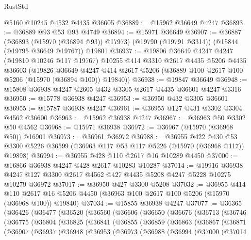 \begin{lexlean}{RustStd}
\begin{coremodule}
    @5160
    @10245
    @4532
    @4435
    @36605
@36889 := @15962 @36649 @4247
@36893 := @36889 @93 @53 @93 @4749
@36894 := @15971 @36649
@36907 := @36887
    (@36893 (@15970 (@36894 @93)) @17973)
    (@19790 (@19791 @3314))
    (@15844 (@19795 @36649 @19767))
    @19801
@36937 := @19806
    @36649
    @4247
    @4247
    (@19810 @10246 @117 @19767)
    @10255
    @414
    @3310
    @2617
    @4435
    @5206
    @4435
    @36603
    (@19826
      @36649
      @4247
      @414
      @2617
      @5206
      (@36889 @100 @2617 @100 @5206 (@15970 (@36894 @100)) @19840))
@36938 := @19847 @36649
@36948 := @15808 @36938 @4247 @2605 @432 @3305 @2617 @4435 @36601 @4247 @3316
@36950 := @15778 @36938 @4247
@36953 := @36950 @432 @3305 @36601
@36955 := @15787 @36938 @4247
@36961 := @36955 @127 @431 @3302 @3304 @4562 @36600
@36963 := @15962 @36938 @4247
@36967 := @36963 @50 @3302 @50 @4562
@36968 := @15971 @36938
@36972 := @36967 (@15970 (@36968 @50)) @16901
@36973 := @36961 @36972
@36988 := @36955
    @422
    @430
    @53
    @3300
    @5226
    @36599
    (@36963 @117 @53 @117 @5226 (@15970 (@36968 @117)) @19898)
@36994 := @36955 @428 @110 @2617 @16 @10289 @4450
@37000 := @16866 @36938 @4247 @428 @2617 @10283 @10287
@37014 := @19916
    @36938
    @4247
    @127
    @3300
    @2617
    @4562
    @427
    @4435
    @5208
    @4247
    @5228
    @10275
    @10279
    @36972
@37017 := @36950 @427 @3300 @5208
@37032 := @36955
    @414
    @110
    @2617
    @16
    @5206
    @4450
    (@36963 @100 @2617 @100 @5206 (@15970 (@36968 @100)) @19840)
@37034 := @15855 @36938 @4247
@37077 := @36365
    (@36426
      (@36477
        (@36520
          (@36560
            (@36606
              (@36650
                (@36676
                  (@36713
                    (@36746
                      (@36775
                        (@36804
                          (@36825
                            (@36841
                              (@36855
                                (@36859
                                  (@36863
                                    (@36867
                                      (@36871
                                        (@36907
                                          (@36937
                                            (@36948
                                              (@36953
                                                (@36973
                                                  (@36988
                                                    (@36994
                                                      (@37000
                                                        (@37014

\end{coremodule}
\end{lexlean}
